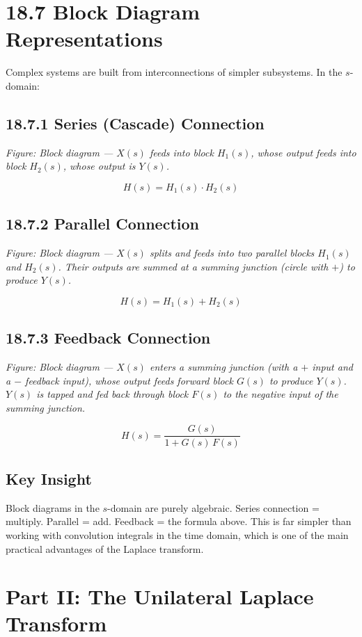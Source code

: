 \documentclass[11pt]{article}
\begin{document}
\section*{18.7 Block Diagram Representations}

Complex systems are built from interconnections of simpler subsystems. In the $s$-domain:

\subsection*{18.7.1 Series (Cascade) Connection}

\textit{Figure: Block diagram — $X(s)$ feeds into block $H_1(s)$, whose output feeds into block $H_2(s)$, whose output is $Y(s)$.}

\[H(s) = H_1(s) \cdot H_2(s)\]

\subsection*{18.7.2 Parallel Connection}

\textit{Figure: Block diagram — $X(s)$ splits and feeds into two parallel blocks $H_1(s)$ and $H_2(s)$. Their outputs are summed at a summing junction (circle with $+$) to produce $Y(s)$.}

\[H(s) = H_1(s) + H_2(s)\]

\subsection*{18.7.3 Feedback Connection}

\textit{Figure: Block diagram — $X(s)$ enters a summing junction (with a $+$ input and a $-$ feedback input), whose output feeds forward block $G(s)$ to produce $Y(s)$. $Y(s)$ is tapped and fed back through block $F(s)$ to the negative input of the summing junction.}

\[H(s) = \frac{G(s)}{1 + G(s)\, F(s)}\]

\subsection*{Key Insight}

Block diagrams in the $s$-domain are purely algebraic. Series connection = multiply. Parallel = add. Feedback = the formula above. This is far simpler than working with convolution integrals in the time domain, which is one of the main practical advantages of the Laplace transform.

\section*{Part II: The Unilateral Laplace Transform}
\end{document}

